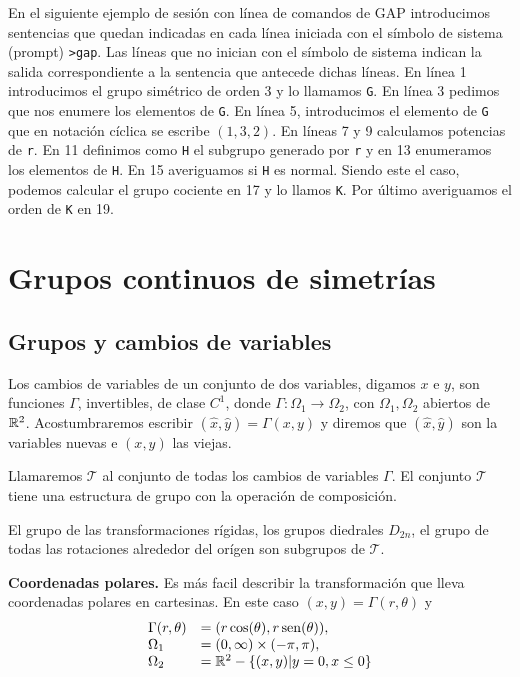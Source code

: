 \begin{ejemplo} En el siguiente ejemplo de sesión con línea de comandos de GAP introducimos sentencias que quedan indicadas en cada línea iniciada con el símbolo de sistema (prompt) \verb~>gap~. Las líneas que no inician con el símbolo de sistema indican la salida correspondiente a la sentencia que antecede dichas líneas. En línea 1 introducimos el grupo simétrico de orden 3 y lo llamamos \texttt{G}. En línea 3 pedimos que nos enumere los elementos de \texttt{G}. En línea 5, introducimos el elemento de \texttt{G} que en notación cíclica se escribe $(1,3,2)$. En líneas 7 y 9 calculamos potencias de \texttt{r}. En 11 definimos como \texttt{H} el subgrupo generado por 
\texttt{r} y en 13 enumeramos los elementos de \texttt{H}. En 15 averiguamos si \texttt{H} es normal. Siendo este el caso, podemos calcular el grupo cociente en 17 y lo llamos \texttt{K}. Por último averiguamos el orden de \texttt{K} en 19. 

 
\end{ejemplo}





\section{Grupos continuos de simetrías}

\subsection{Grupos y cambios de variables}

Los cambios de variables de un conjunto de dos variables, digamos $x$ e $y$, son funciones $\Gamma$, invertibles,  de clase $C^1$, donde $\Gamma:\Omega_1\to\Omega_2$, con $\Omega_1,\Omega_2$ abiertos de $\mathbb{R}^2$.  Acostumbraremos escribir $(\hat{x},\hat{y})=\Gamma(x,y)$ y diremos que $(\hat{x},\hat{y})$ son la variables nuevas e $(x,y)$ las viejas.

 Llamaremos $\mathscr{T}$ al conjunto de todas los cambios de variables $\Gamma$.
El conjunto  $\mathscr{T}$ tiene una estructura de grupo con la operación de composición.

 El grupo de las transformaciones rígidas, los grupos diedrales $D_{2n}$, el grupo de todas las rotaciones alrededor del orígen son subgrupos de  $\mathscr{T}$.




 \begin{ejemplo} \textbf{Coordenadas polares.} Es más facil describir la transformación que lleva coordenadas polares en cartesinas. En este caso $(x,y)=\Gamma(r,\theta)$ y
\[
\begin{array}{ll}
\Gamma(r,\theta)&=(r\cos(\theta),r\operatorname{sen}(\theta)),\\
\Omega_1&=(0,\infty)\times (-\pi,\pi),\\
\Omega_2&=\mathbb{R}^2-\{(x,y)|y=0,x\leq 0\}\\
\end{array}
\]

 \end{ejemplo}

